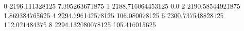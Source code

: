 0 2196.111328125 7.395263671875
1 2188.716064453125 0.0
2 2190.58544921875 1.869384765625
4 2294.796142578125 106.080078125
6 2300.737548828125 112.021484375
8 2294.132080078125 105.416015625
